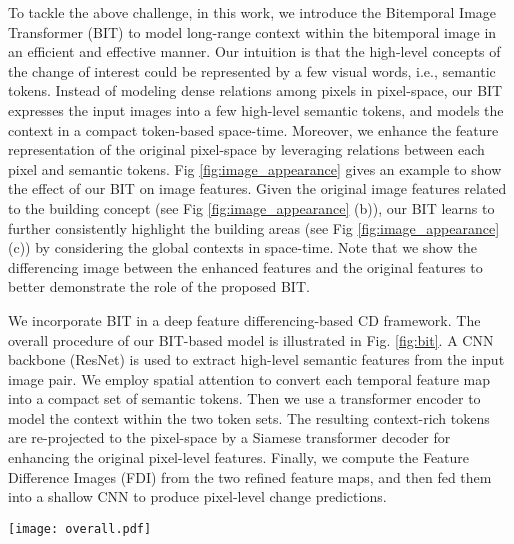 \documentclass[journal]{IEEEtran}
\begin{document}
To tackle the above challenge, in this work, we introduce the Bitemporal Image Transformer (BIT) to model long-range context within the bitemporal image in an efficient and effective manner. Our intuition is that the high-level concepts of the change of interest could be represented by a few visual words, i.e., semantic tokens. Instead of modeling dense relations among pixels in pixel-space, our BIT expresses the input images into a few high-level semantic tokens, and models the context in a compact token-based space-time. Moreover, we enhance the feature representation of the original pixel-space by leveraging relations between each pixel and semantic tokens. Fig \ref{fig:image_appearance} gives an example to show the effect of our BIT on image features. Given the original image features related to the building concept (see Fig \ref{fig:image_appearance} (b)), our BIT learns to further consistently highlight the building areas (see Fig \ref{fig:image_appearance} (c)) by considering the global contexts in space-time. Note that we show the differencing image between the enhanced features and the original features to better demonstrate the role of the proposed BIT.


We incorporate BIT in a deep feature differencing-based CD framework. The overall procedure of our BIT-based model is illustrated in Fig. \ref{fig:bit}. A CNN backbone (ResNet) is used to extract high-level semantic features from the input image pair. We employ spatial attention to convert each temporal feature map into a compact set of semantic tokens. Then we use a transformer \cite{Vaswani2017} encoder to model the context within the two token sets. The resulting context-rich tokens are re-projected to the pixel-space by a Siamese transformer decoder for enhancing the original pixel-level features. Finally, we compute the Feature Difference Images (FDI) from the two refined feature maps, and then fed them into a shallow CNN to produce pixel-level change predictions.

\begin{figure*}
        \centering
        \texttt{[image: overall.pdf]}   
        \caption{Illustration of our BIT-based model. Our semantic tokenizer pools the image features extracted by a CNN backbone to a compact vocabulary set of tokens (). Then we feed the concatenated bitemporal tokens to the transformer encoder to relate concepts in token-based space-time. The resulting context-rich tokens for each temporal image are projected back to the pixel-space to refine the original features via the transformer decoder. Finally, our prediction head produces the pixel-level predictions by feeding the computed feature difference images to a shallow CNN.}
        \label{fig:bit}
\end{figure*}
\end{document}
